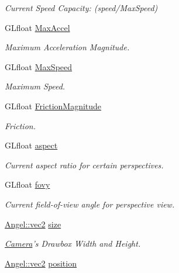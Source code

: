 \begin{DoxyCompactItemize}
\begin{DoxyCompactList}\small\item\em Current Speed Capacity\-: (speed/\-Max\-Speed) \end{DoxyCompactList}\item 
\hypertarget{class_camera_a7817b2e83ad8f783e2822ec7771c6fe9}{G\-Lfloat \hyperlink{class_camera_a7817b2e83ad8f783e2822ec7771c6fe9}{Max\-Accel}}\label{class_camera_a7817b2e83ad8f783e2822ec7771c6fe9}

\begin{DoxyCompactList}\small\item\em Maximum Acceleration Magnitude. \end{DoxyCompactList}\item 
\hypertarget{class_camera_a4e6866298a8e7a1ff2f529202892958e}{G\-Lfloat \hyperlink{class_camera_a4e6866298a8e7a1ff2f529202892958e}{Max\-Speed}}\label{class_camera_a4e6866298a8e7a1ff2f529202892958e}

\begin{DoxyCompactList}\small\item\em Maximum Speed. \end{DoxyCompactList}\item 
G\-Lfloat \hyperlink{class_camera_a4260507a4e59b2b079a0e1c6a5b64d5c}{Friction\-Magnitude}
\begin{DoxyCompactList}\small\item\em Friction. \end{DoxyCompactList}\item 
G\-Lfloat \hyperlink{class_camera_af3fdbc52ba0f7af7d8091986d6303119}{aspect}
\begin{DoxyCompactList}\small\item\em Current aspect ratio for certain perspectives. \end{DoxyCompactList}\item 
G\-Lfloat \hyperlink{class_camera_acc8b97facc57059530efad534c2f8314}{fovy}
\begin{DoxyCompactList}\small\item\em Current field-\/of-\/view angle for perspective view. \end{DoxyCompactList}\item 
\hypertarget{class_camera_ac14470d1908bd4190a1b83ef0ff70193}{\hyperlink{struct_angel_1_1vec2}{Angel\-::vec2} \hyperlink{class_camera_ac14470d1908bd4190a1b83ef0ff70193}{size}}\label{class_camera_ac14470d1908bd4190a1b83ef0ff70193}

\begin{DoxyCompactList}\small\item\em \hyperlink{class_camera}{Camera}'s Drawbox Width and Height. \end{DoxyCompactList}\item 
\hypertarget{class_camera_ab817e0ffa85b419328739e6805b4485f}{\hyperlink{struct_angel_1_1vec2}{Angel\-::vec2} \hyperlink{class_camera_ab817e0ffa85b419328739e6805b4485f}{position}}\label{class_camera_ab817e0ffa85b419328739e6805b4485f}


\end{DoxyCompactItemize}

